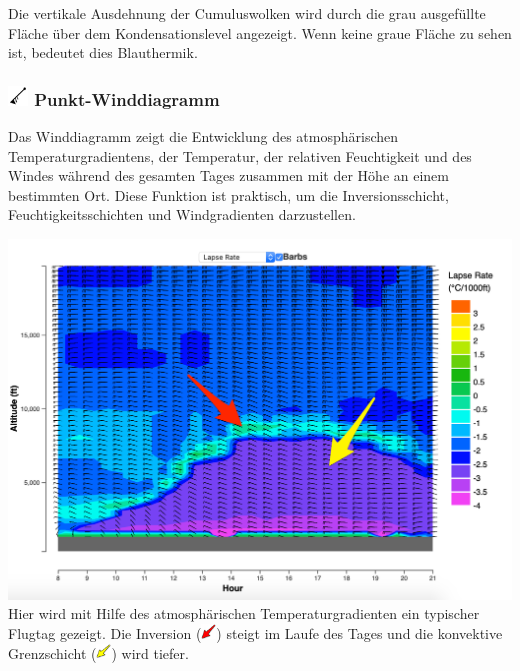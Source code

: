 \documentclass[9pt,a4paper,twocolumn]{article}
\begin{document}
Die vertikale Ausdehnung der Cumuluswolken wird durch die grau ausgefüllte Fläche über dem Kondensationslevel angezeigt. Wenn keine graue Fläche zu sehen ist, bedeutet dies Blauthermik.

\subsubsection*{\includegraphics[height=15pt]{images/icons/windgram.png} Punkt-Winddiagramm}
Das Winddiagramm zeigt die Entwicklung des atmosphärischen Temperaturgradientens, der Temperatur, der relativen Feuchtigkeit und des Windes während des gesamten Tages zusammen mit der Höhe an einem bestimmten Ort. Diese Funktion ist praktisch, um die Inversionsschicht, Feuchtigkeitsschichten und Windgradienten darzustellen.

\includegraphics[width=\linewidth]{images/windgram_lapse_annot.png}
Hier wird mit Hilfe des atmosphärischen Temperaturgradienten ein typischer Flugtag gezeigt. Die Inversion (\includegraphics[height=11pt]{images/icons/arrow_red.png}) steigt im Laufe des Tages und die konvektive Grenzschicht (\includegraphics[height=11pt]{images/icons/arrow_yellow.png}) wird tiefer. 
\end{document}
